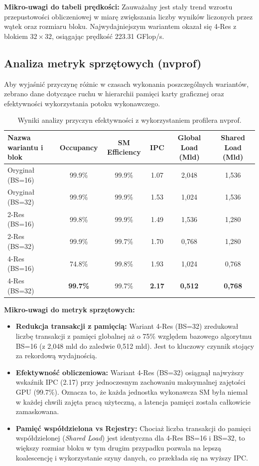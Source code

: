 \documentclass[10pt]{article}
\begin{document}
\textbf{Mikro-uwagi do tabeli prędkości:}
Zauważalny jest stały trend wzrostu przepustowości obliczeniowej w miarę zwiększania liczby wyników liczonych przez wątek oraz rozmiaru bloku. Najwydajniejszym wariantem okazał się 4-Res z blokiem $32 \times 32$, osiągając prędkość 223.31 GFlop/s.

\subsection*{Analiza metryk sprzętowych (nvprof)}
Aby wyjaśnić przyczynę różnic w czasach wykonania poszczególnych wariantów, zebrano dane dotyczące ruchu w hierarchii pamięci karty graficznej oraz efektywności wykorzystania potoku wykonawczego.

\begin{table}[h!]
\centering
\begingroup
\begin{tabular}{|l|c|c|c|c|c|}
\hline
\textbf{Nazwa wariantu i blok} & \textbf{Occupancy} & \textbf{SM Efficiency} & \textbf{IPC} & \textbf{Global Load (Mld)} & \textbf{Shared Load (Mld)} \\
\hline
Oryginał (BS=16) & 99.9\% & 99.9\% & 1.07 & 2,048 & 1,536 \\
\hline
Oryginał (BS=32) & 99.9\% & 99.9\% & 1.53 & 1,024 & 1,536 \\
\hline
2-Res (BS=16) & 99.8\% & 99.9\% & 1.49 & 1,536 & 1,280 \\
\hline
2-Res (BS=32) & 99.9\% & 99.7\% & 1.70 & 0,768 & 1,280 \\
\hline
4-Res (BS=16) & 74.8\% & 99.8\% & 1.93 & 1,024 & 0,768 \\
\hline
4-Res (BS=32) & \textbf{99.7\%} & 99.7\% & \textbf{2.17} & \textbf{0,512} & \textbf{0,768} \\
\hline
\end{tabular}
\endgroup
\caption{Wyniki analizy przyczyn efektywności z wykorzystaniem profilera nvprof.}
\end{table}

\textbf{Mikro-uwagi do metryk sprzętowych:}
\begin{itemize}
    \item \textbf{Redukcja transakcji z pamięcią:} Wariant 4-Res (BS=32) zredukował liczbę transakcji z pamięci globalnej aż o 75\% względem bazowego algorytmu BS=16 (z 2,048 mld do zaledwie 0,512 mld). Jest to kluczowy czynnik stojący za rekordową wydajnością.
    \item \textbf{Efektywność obliczeniowa:} Wariant 4-Res (BS=32) osiągnął najwyższy wskaźnik IPC (2.17) przy jednoczesnym zachowaniu maksymalnej zajętości GPU (99.7\%). Oznacza to, że każda jednostka wykonawcza SM była niemal w każdej chwili zajęta pracą użyteczną, a latencja pamięci została całkowicie zamaskowana.
    \item \textbf{Pamięć współdzielona vs Rejestry:} Chociaż liczba transakcji do pamięci współdzielonej (\textit{Shared Load}) jest identyczna dla 4-Res BS=16 i BS=32, to większy rozmiar bloku w tym drugim przypadku pozwala na lepszą koalescencję i wykorzystanie szyny danych, co przekłada się na wyższy IPC.
\end{itemize}
\end{document}

